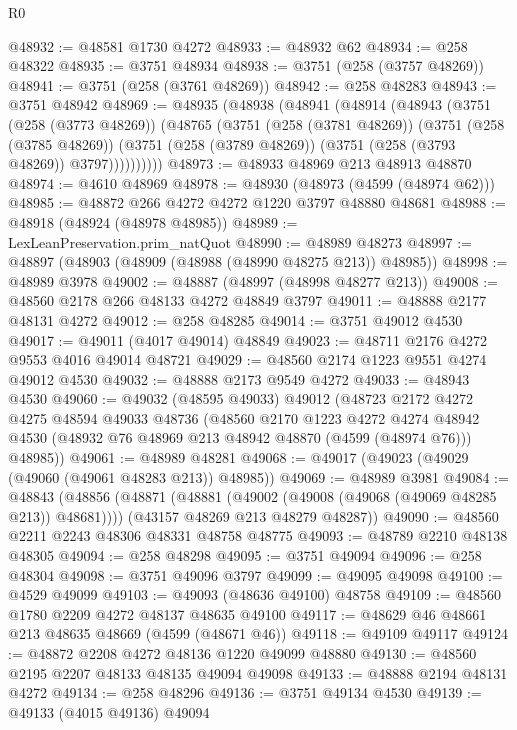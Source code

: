\begin{lexlean}{R0}
\begin{coremodule}
@48932 := @48581 @1730 @4272
@48933 := @48932 @62
@48934 := @258 @48322
@48935 := @3751 @48934
@48938 := @3751 (@258 (@3757 @48269))
@48941 := @3751 (@258 (@3761 @48269))
@48942 := @258 @48283
@48943 := @3751 @48942
@48969 := @48935
    (@48938
      (@48941
        (@48914
          (@48943
            (@3751
              (@258 (@3773 @48269))
              (@48765
                (@3751
                  (@258 (@3781 @48269))
                  (@3751
                    (@258 (@3785 @48269))
                    (@3751 (@258 (@3789 @48269)) (@3751 (@258 (@3793 @48269)) @3797))))))))))
@48973 := @48933 @48969 @213 @48913 @48870
@48974 := @4610 @48969
@48978 := @48930 (@48973 (@4599 (@48974 @62)))
@48985 := @48872 @266 @4272 @4272 @1220 @3797 @48880 @48681
@48988 := @48918 (@48924 (@48978 @48985))
@48989 := LexLeanPreservation.prim_natQuot
@48990 := @48989 @48273
@48997 := @48897 (@48903 (@48909 (@48988 (@48990 @48275 @213)) @48985))
@48998 := @48989 @3978
@49002 := @48887 (@48997 (@48998 @48277 @213))
@49008 := @48560 @2178 @266 @48133 @4272 @48849 @3797
@49011 := @48888 @2177 @48131 @4272
@49012 := @258 @48285
@49014 := @3751 @49012 @4530
@49017 := @49011 (@4017 @49014) @48849
@49023 := @48711 @2176 @4272 @9553 @4016 @49014 @48721
@49029 := @48560 @2174 @1223 @9551 @4274 @49012 @4530
@49032 := @48888 @2173 @9549 @4272
@49033 := @48943 @4530
@49060 := @49032
    (@48595 @49033)
    @49012
    (@48723
      @2172
      @4272
      @4275
      @48594
      @49033
      @48736
      (@48560
        @2170
        @1223
        @4272
        @4274
        @48942
        @4530
        (@48932 @76 @48969 @213 @48942 @48870 (@4599 (@48974 @76)))
        @48985))
@49061 := @48989 @48281
@49068 := @49017 (@49023 (@49029 (@49060 (@49061 @48283 @213)) @48985))
@49069 := @48989 @3981
@49084 := @48843
    (@48856
      (@48871 (@48881 (@49002 (@49008 (@49068 (@49069 @48285 @213)) @48681))))
      (@43157 @48269 @213 @48279 @48287))
@49090 := @48560 @2211 @2243 @48306 @48331 @48758 @48775
@49093 := @48789 @2210 @48138 @48305
@49094 := @258 @48298
@49095 := @3751 @49094
@49096 := @258 @48304
@49098 := @3751 @49096 @3797
@49099 := @49095 @49098
@49100 := @4529 @49099
@49103 := @49093 (@48636 @49100) @48758
@49109 := @48560 @1780 @2209 @4272 @48137 @48635 @49100
@49117 := @48629 @46 @48661 @213 @48635 @48669 (@4599 (@48671 @46))
@49118 := @49109 @49117
@49124 := @48872 @2208 @4272 @48136 @1220 @49099 @48880
@49130 := @48560 @2195 @2207 @48133 @48135 @49094 @49098
@49133 := @48888 @2194 @48131 @4272
@49134 := @258 @48296
@49136 := @3751 @49134 @4530
@49139 := @49133 (@4015 @49136) @49094

\end{coremodule}
\end{lexlean}
